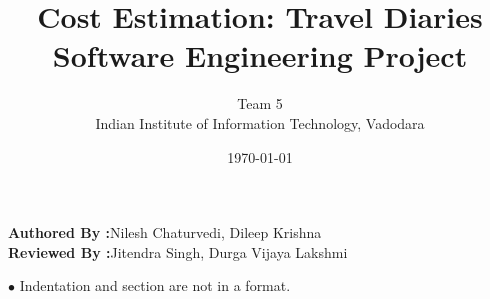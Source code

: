 \documentclass[12pt]{article}
\title{Cost Estimation: Travel Diaries\\Software Engineering Project }
\author{Team 5\\Indian Institute of Information Technology, Vadodara}
\date{\today}
\begin{document}
	\maketitle
	\begin{center}
		\textbf{\Large{Authored By :}}\Large{Nilesh Chaturvedi, Dileep Krishna}  \\
		\textbf{\Large{Reviewed By :}}\Large{Jitendra Singh, Durga Vijaya Lakshmi} \\[2\baselineskip]  
	\end{center}
	
	

	
	
	\item[$\bullet$ ]  Indentation and section are not in a format.

		
		
	
	
	
\end{document}
